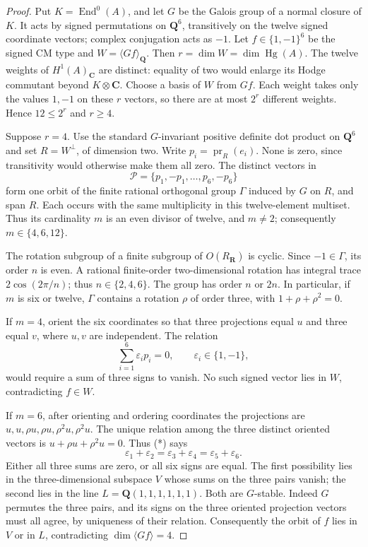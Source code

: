 \documentclass[10pt,reqno]{article}
\theoremstyle{emphasizedplain}
\theoremstyle{emphasizeddefinition}
\theoremstyle{emphasizeddefinition}
\DeclareMathOperator{\End}{End}
\DeclareMathOperator{\Hg}{Hg}
\newcommand{\Q}{\mathbf Q}
\newcommand{\C}{\mathbf C}
\newcommand{\R}{\mathbf R}
\begin{document}
\begin{proof}
Put $K=\End^0(A)$, and let $G$ be the Galois group of a normal closure
of $K$. It acts by signed permutations on $\Q^6$, transitively on
the twelve signed coordinate vectors; complex conjugation acts as $-1$.
Let $f\in\{1,-1\}^6$ be the signed CM type and
$W=\langle Gf\rangle_\Q$. Then $r=\dim W=\dim\Hg(A)$.
The twelve weights of $H^1(A)_\C$ are distinct: equality of two would
enlarge its Hodge commutant beyond $K\otimes\C$.
Choose a basis of $W$ from $Gf$. Each weight takes only the values
$1,-1$ on these $r$ vectors, so there are at most $2^r$ different
weights. Hence $12\le2^r$ and $r\ge4$.

Suppose $r=4$. Use the standard $G$-invariant positive definite dot
product on $\Q^6$ and set $R=W^\perp$, of dimension two. Write
$p_i=\operatorname{pr}_R(e_i)$. None is zero, since transitivity
would otherwise make them all zero. The distinct vectors in
\[
 \mathcal P=\{p_1,-p_1,\ldots,p_6,-p_6\}
\]
form one orbit of the finite rational orthogonal group $\Gamma$
induced by $G$ on $R$, and span $R$. Each occurs with the same
multiplicity in this twelve-element multiset. Thus its cardinality
$m$ is an even divisor of twelve, and $m\ne2$; consequently
$m\in\{4,6,12\}$.

The rotation subgroup of a finite subgroup of $O(R_\R)$ is cyclic.
Since $-1\in\Gamma$, its order $n$ is even. A rational finite-order
two-dimensional rotation has integral trace $2\cos(2\pi/n)$;
thus $n\in\{2,4,6\}$. The group has order $n$ or $2n$.
In particular, if $m$ is six or twelve, $\Gamma$ contains a rotation
$\rho$ of order three, with $1+\rho+\rho^2=0$.

If $m=4$, orient the six coordinates so that three projections equal
$u$ and three equal $v$, where $u,v$ are independent. The relation
\[
 \sum_{i=1}^6\varepsilon_i p_i=0,
 \qquad \varepsilon_i\in\{1,-1\},
 \tag{*}
\]
would require a sum of three signs to vanish. No such signed vector
lies in $W$, contradicting $f\in W$.

If $m=6$, after orienting and ordering coordinates the projections
are $u,u,\rho u,\rho u,\rho^2u,\rho^2u$.
The unique relation among the three distinct oriented vectors is
$u+\rho u+\rho^2u=0$. Thus (*) says
\[
 \varepsilon_1+\varepsilon_2
 =\varepsilon_3+\varepsilon_4
 =\varepsilon_5+\varepsilon_6.
\]
Either all three sums are zero, or all six signs are equal.
The first possibility lies in the three-dimensional subspace $V$
whose sums on the three pairs vanish; the second lies in the line
$L=\Q(1,1,1,1,1,1)$. Both are $G$-stable. Indeed $G$ permutes the
three pairs, and its signs on the three oriented projection vectors
must all agree, by uniqueness of their relation.
Consequently the orbit of $f$ lies in $V$ or in $L$, contradicting
$\dim\langle Gf\rangle=4$.


\end{proof}
\end{document}

